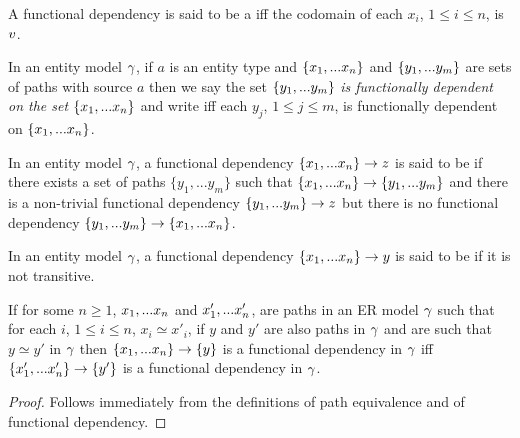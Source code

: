\begin{definition}
A functional dependency  is said to be a  iff
 the codomain of each $x_i$, $1 \leq i \leq n$, is $v$.
\end{definition}

\begin{definition}
In an entity model $\gamma$, if
$a$ is an entity type and $\left\{x_1,...x_n\right\}$ and $\left\{y_1,...y_m\right\}$ are sets of paths with source $a$
then we say the set $\left\{y_1,...y_m\right\}$ \textit{is functionally dependent on the set} $\left\{x_1,...x_n\right\}$ and write
iff  each $y_j$, $1 \leq j \leq m$, is functionally dependent on $\left\{x_1,...x_n\right\}$.
\end{definition}
\begin{definition} %
In an entity model $\gamma$, a functional dependency $\left\{x_1,...x_n\right\} \rightarrow z$
is said to be  if there exists a set of paths $\{y_1,...y_{m}\}$ such that
$\left\{x_1,...x_n\right\} \rightarrow \left\{y_1,...y_{m}\right\}$ and there is a non-trivial functional
dependency $\left\{y_1,...y_{m}\right\} \rightarrow z$ but there is no functional dependency 
$\{y_1,...y_{m}\} \rightarrow \{x_1,...x_n\}$.
\end{definition}
\begin{definition} %
In an entity model $\gamma$, a functional dependency $\left\{x_1,...x_n\right\} \rightarrow y$
is said to be  if it is not transitive.
\end{definition} 

\begin{lemma}
If for some $n \geq 1$, $x_1,...x_n$ and $x'_1,...x'_n$,  are paths in an ER model $\gamma$
such that for each $i$, $1 \leq i \leq n$, $x_i \simeq x'_i$,
if $y$ and $y'$ are also paths in $\gamma$ and are 
such that $y \simeq y'$ in $\gamma$ then $\left\{x_1,...x_n\right\} \rightarrow \left\{y\right\}$ is a functional dependency in $\gamma$ iff 
$\left\{x'_1,...x'_n\right\} \rightarrow \left\{y'\right\}$ is a functional dependency in $\gamma$.
\end{lemma}
\begin{proof}
Follows immediately from the definitions of path equivalence and of functional dependency.
\end{proof}

